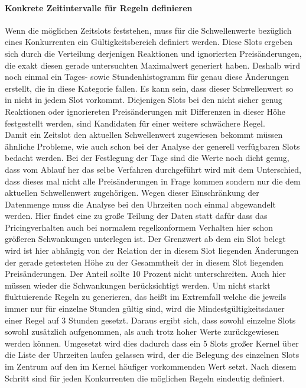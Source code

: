 \documentclass[12pt,a4paper,bibliography=totocnumbered,listof=totocnumbered]{scrartcl}
\begin{document}
\paragraph{Konkrete Zeitintervalle für Regeln definieren}
Wenn die möglichen Zeitslots feststehen, muss für die Schwellenwerte bezüglich eines Konkurrenten ein Gültigkeitsbereich definiert werden. Diese Slots ergeben sich durch die Verteilung derjenigen Reaktionen und ignorierten Preisänderungen, die exakt diesen gerade untersuchten Maximalwert generiert haben. Deshalb wird noch einmal ein Tages- sowie Stundenhistogramm für genau diese Änderungen erstellt, die in diese Kategorie fallen. Es kann sein, dass dieser Schwellenwert so in nicht in jedem Slot vorkommt. Diejenigen Slots bei den nicht sicher genug Reaktionen oder ignoriereten Preisänderungen mit Differenzen in dieser Höhe festgestellt werden, sind Kandidaten für einer weitere schwächere Regel.\\
Damit ein Zeitslot den aktuellen Schwellenwert zugewiesen bekommt müssen ähnliche Probleme, wie auch schon bei der Analyse der generell verfügbaren Slots bedacht werden. Bei der Festlegung der Tage sind die Werte noch dicht genug, dass vom Ablauf her das selbe Verfahren durchgeführt wird mit dem Unterschied, dass dieses mal nicht alle Preisänderungen in Frage kommen sondern nur die dem aktuellen Schwellenwert zugehörigen. Wegen dieser Einschränkung der Datenmenge muss die Analyse bei den Uhrzeiten noch einmal abgewandelt werden. Hier findet eine zu große Teilung der Daten statt dafür dass das Pricingverhalten auch bei normalem regelkonformem Verhalten hier schon größeren Schwankungen unterlegen ist. Der Grenzwert ab dem ein Slot belegt wird ist hier abhängig von der Relation der in diesem Slot liegenden Änderungen der gerade getesteten Höhe zu der Gesammtheit der in diesem Slot liegenden Preisänderungen. Der Anteil sollte 10 Prozent nicht unterschreiten. Auch hier müssen wieder die Schwankungen berücksichtigt werden. Um nicht starkt fluktuierende Regeln zu generieren, das heißt im Extremfall welche die jeweils immer nur für einzelne Stunden gültig sind, wird die Mindestgültigkeitsdauer einer Regel auf 3 Stunden gesetzt. Daraus ergibt sich, dass sowohl einzelne Slots sowohl zusätzlich aufgenommen, als auch trotz hoher Werte zurückgewiesen werden können. Umgesetzt wird dies dadurch dass ein 5 Slots großer Kernel über die Liste der Uhrzeiten laufen gelassen wird, der die Belegung des einzelnen Slots im Zentrum auf den im Kernel häufiger vorkommenden Wert setzt. Nach diesem Schritt sind für jeden Konkurrenten die möglichen Regeln eindeutig definiert.
\end{document}
